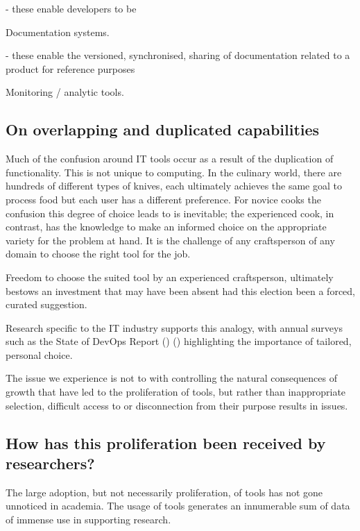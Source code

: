- these enable developers to be 

Documentation systems.

- these enable the versioned, synchronised, sharing of documentation related to a product for reference purposes

Monitoring / analytic tools.

\subsection{On overlapping and duplicated capabilities}

Much of the confusion around IT tools occur as a result of the duplication of functionality. This is not unique to computing. In the culinary world, there are hundreds of different types of knives, each ultimately achieves the same goal to process food but each user has a different preference. For novice cooks the confusion this degree of choice leads to is inevitable; the experienced cook, in contrast, has the knowledge to make an informed choice on the appropriate variety for the problem at hand. It is the challenge of any craftsperson of any domain to choose the right tool for the job.

Freedom to choose the suited tool by an experienced craftsperson, ultimately bestows an investment that may have been absent had this election been a forced, curated suggestion.


Research specific to the IT industry supports this analogy, with annual surveys such as the State of DevOps Report () ()  highlighting the importance of tailored, personal choice. 

The issue we experience is not to with controlling the natural consequences of growth that have led to the proliferation of tools, but rather than inappropriate selection, difficult access to or disconnection from their purpose results in issues. 


\subsection{How has this proliferation been received by researchers?}

The large adoption, but not necessarily proliferation, of tools has not gone unnoticed in academia. The usage of tools generates an innumerable sum of data of immense use in supporting research.

